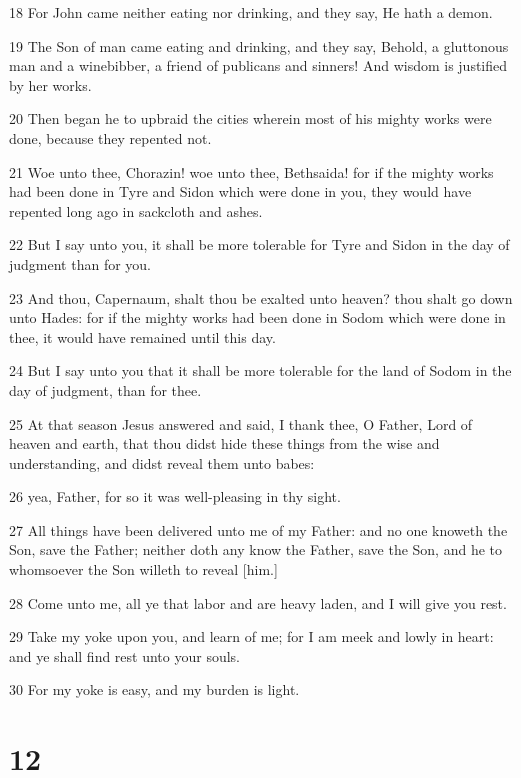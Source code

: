 \par 18 For John came neither eating nor drinking, and they say, He hath a demon.
\par 19 The Son of man came eating and drinking, and they say, Behold, a gluttonous man and a winebibber, a friend of publicans and sinners! And wisdom is justified by her works.
\par 20 Then began he to upbraid the cities wherein most of his mighty works were done, because they repented not.
\par 21 Woe unto thee, Chorazin! woe unto thee, Bethsaida! for if the mighty works had been done in Tyre and Sidon which were done in you, they would have repented long ago in sackcloth and ashes.
\par 22 But I say unto you, it shall be more tolerable for Tyre and Sidon in the day of judgment than for you.
\par 23 And thou, Capernaum, shalt thou be exalted unto heaven? thou shalt go down unto Hades: for if the mighty works had been done in Sodom which were done in thee, it would have remained until this day.
\par 24 But I say unto you that it shall be more tolerable for the land of Sodom in the day of judgment, than for thee.
\par 25 At that season Jesus answered and said, I thank thee, O Father, Lord of heaven and earth, that thou didst hide these things from the wise and understanding, and didst reveal them unto babes:
\par 26 yea, Father, for so it was well-pleasing in thy sight.
\par 27 All things have been delivered unto me of my Father: and no one knoweth the Son, save the Father; neither doth any know the Father, save the Son, and he to whomsoever the Son willeth to reveal [him.]
\par 28 Come unto me, all ye that labor and are heavy laden, and I will give you rest.
\par 29 Take my yoke upon you, and learn of me; for I am meek and lowly in heart: and ye shall find rest unto your souls.
\par 30 For my yoke is easy, and my burden is light.

\chapter{12}

